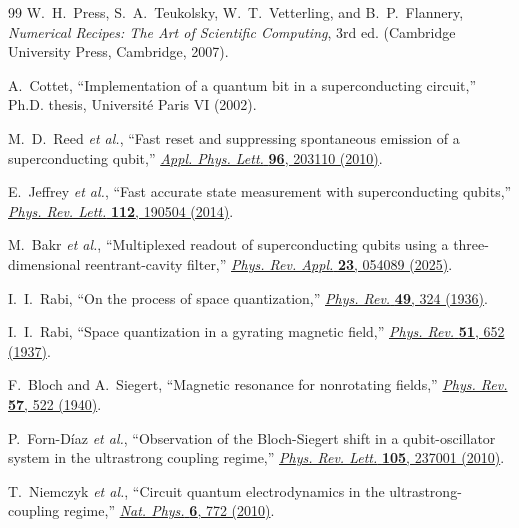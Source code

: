 \documentclass[reprint, floatfix, superscriptaddress, amsmath, amssymb, longbibliography]{revtex4-2}
\begin{document}
\begin{thebibliography}{99}
W.~H.~Press, S.~A.~Teukolsky, W.~T.~Vetterling, and B.~P.~Flannery,
\textit{Numerical Recipes: The Art of Scientific Computing}, 3rd ed.
(Cambridge University Press, Cambridge, 2007).

A.~Cottet, ``Implementation of a quantum bit in a superconducting circuit,''
Ph.D. thesis, Universit\'{e} Paris VI (2002).

M.~D.~Reed \textit{et al.}, ``Fast reset and suppressing spontaneous emission of a superconducting qubit,''
\href{https://doi.org/10.1063/1.3435463}{\textit{Appl. Phys. Lett.} \textbf{96}, 203110 (2010)}.

E.~Jeffrey \textit{et al.}, ``Fast accurate state measurement with superconducting qubits,''
\href{https://doi.org/10.1103/PhysRevLett.112.190504}{\textit{Phys. Rev. Lett.} \textbf{112}, 190504 (2014)}.

M.~Bakr \textit{et al.},
``Multiplexed readout of superconducting qubits using a three-dimensional reentrant-cavity filter,''
\href{https://doi.org/10.1103/PhysRevApplied.23.054089}{\textit{Phys. Rev. Appl.} \textbf{23}, 054089 (2025)}.

I.~I.~Rabi, ``On the process of space quantization,''
\href{https://doi.org/10.1103/PhysRev.49.324}{\textit{Phys. Rev.} \textbf{49}, 324 (1936)}.

I.~I.~Rabi, ``Space quantization in a gyrating magnetic field,''
\href{https://doi.org/10.1103/PhysRev.51.652}{\textit{Phys. Rev.} \textbf{51}, 652 (1937)}.

F.~Bloch and A.~Siegert, ``Magnetic resonance for nonrotating fields,''
\href{https://doi.org/10.1103/PhysRev.57.522}{\textit{Phys. Rev.} \textbf{57}, 522 (1940)}.

P.~Forn-D\'{i}az \textit{et al.}, ``Observation of the Bloch-Siegert shift in a qubit-oscillator system in the ultrastrong coupling regime,''
\href{https://doi.org/10.1103/PhysRevLett.105.237001}{\textit{Phys. Rev. Lett.} \textbf{105}, 237001 (2010)}.

T.~Niemczyk \textit{et al.},
``Circuit quantum electrodynamics in the ultrastrong-coupling regime,''
\href{https://doi.org/10.1038/nphys1730}{\textit{Nat. Phys.} \textbf{6}, 772 (2010)}.


\end{thebibliography}
\end{document}
